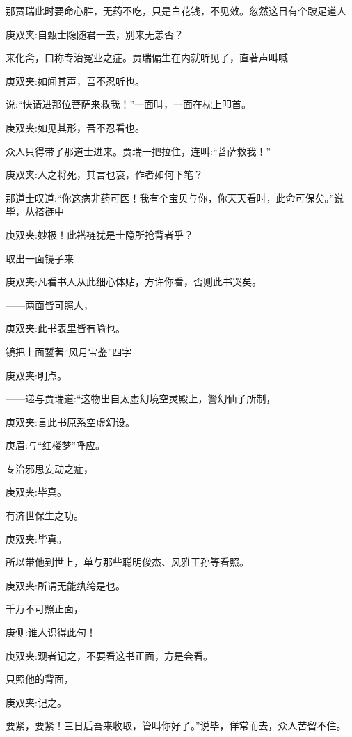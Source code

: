 \begin{parag}
    那贾瑞此时要命心胜，无药不吃，只是白花钱，不见效。忽然这日有个跛足道人\begin{note}庚双夹:自甄士隐随君一去，别来无恙否？\end{note}来化斋，口称专治冤业之症。贾瑞偏生在内就听见了，直著声叫喊\begin{note}庚双夹:如闻其声，吾不忍听也。\end{note}说:“快请进那位菩萨来救我！”一面叫，一面在枕上叩首。\begin{note}庚双夹:如见其形，吾不忍看也。\end{note}众人只得带了那道士进来。贾瑞一把拉住，连叫:“菩萨救我！”\begin{note}庚双夹:人之将死，其言也哀，作者如何下笔？\end{note}那道士叹道:“你这病非药可医！我有个宝贝与你，你天天看时，此命可保矣。”说毕，从褡裢中\begin{note}庚双夹:妙极！此褡裢犹是士隐所抢背者乎？\end{note}取出一面镜子来\begin{note}庚双夹:凡看书人从此细心体贴，方许你看，否则此书哭矣。\end{note}——两面皆可照人，\begin{note}庚双夹:此书表里皆有喻也。\end{note}镜把上面錾著“风月宝鉴”四字\begin{note}庚双夹:明点。\end{note}——递与贾瑞道:“这物出自太虚幻境空灵殿上，警幻仙子所制，\begin{note}庚双夹:言此书原系空虚幻设。\end{note}\begin{note}庚眉:与“红楼梦”呼应。\end{note}专治邪思妄动之症，\begin{note}庚双夹:毕真。\end{note}有济世保生之功。\begin{note}庚双夹:毕真。\end{note}所以带他到世上，单与那些聪明俊杰、风雅王孙等看照。\begin{note}庚双夹:所谓无能纨绔是也。\end{note}千万不可照正面，\begin{note}庚侧:谁人识得此句！\end{note}\begin{note}庚双夹:观者记之，不要看这书正面，方是会看。\end{note}只照他的背面，\begin{note}庚双夹:记之。\end{note}要紧，要紧！三日后吾来收取，管叫你好了。”说毕，佯常而去，众人苦留不住。
\end{parag}


